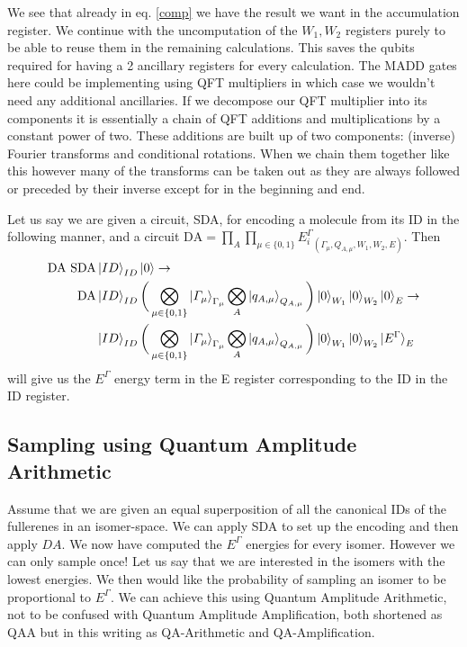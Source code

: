 We see that already in eq. \ref{comp} we have the result we want in the accumulation register. We continue with the uncomputation of the $W_1,W_2$ registers purely to be able to reuse them in the remaining calculations. This saves the qubits required for having a 2 ancillary registers for every calculation. The MADD gates here could be implementing using QFT multipliers\cite{perez2017} in which case we wouldn't need any additional ancillaries. If we decompose our QFT multiplier into its components it is essentially a chain of QFT additions\cite{draper2000,perez2017} and multiplications by a constant power of two. These additions are built up of two components: (inverse) Fourier transforms and conditional rotations. When we chain them together like this however many of the transforms can be taken out as they are always followed or preceded by their inverse except for in the beginning and end. 



Let us say we are given a circuit, SDA, for encoding a molecule from its ID in the following manner, and a circuit $\text{DA}=\prod_{A}\prod_{\mu\in \{0,1\}} {E_i^\Gamma}_{(\Gamma_\mu,Q_{A,\mu},W_1,W_2,E)}$. Then 
\begin{equation}
\begin{split}
    \text{DA}\ \text{SDA}&\ket{ID}_{ID}\ket{0}\to\\
    \text{DA}&\ket{ID}_{ID}\bigg(\bigotimes_{\mu\in \{0,1\}}\ket{\varGamma_\mu}_{\Gamma_\mu}\bigotimes_{A}\ket{q_{A,\mu}}_{Q_{A,\mu}}\bigg)\ket{0}_{W_1}\ket{0}_{W_2}\ket{0}_E \to\\
    &\ket{ID}_{ID}\bigg(\bigotimes_{\mu\in \{0,1\}}\ket{\varGamma_\mu}_{\Gamma_\mu}\bigotimes_{A}\ket{q_{A,\mu}}_{Q_{A,\mu}}\bigg)\ket{0}_{W_1}\ket{0}_{W_2}\ket{E^\Gamma}_E\\
\end{split}
\end{equation}
\noindent
will give us the $E^\Gamma$ energy term in the E register corresponding to the ID in the ID register.

\subsection{Sampling using Quantum Amplitude Arithmetic}
Assume that we are given an equal superposition of all the canonical IDs of the fullerenes in an isomer-space. We can apply SDA to set up the encoding and then apply $DA$. We now have computed the $E^\Gamma$ energies for every isomer. However we can only sample once! Let us say that we are interested in the isomers with the lowest energies. We then would like the probability of sampling an isomer to be proportional to $E^\Gamma$. We can achieve this using Quantum Amplitude Arithmetic\cite{wang2020}, not to be confused with Quantum Amplitude Amplification, both shortened as QAA but in this writing as QA-Arithmetic and QA-Amplification. 


